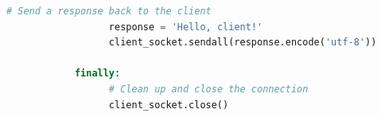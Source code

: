 \begin{multicols}{2}
\begin{lstlisting}[language=Python, caption=TCP Server Example Using Sockets in Python]
                  # Send a response back to the client
                  response = 'Hello, client!'
                  client_socket.sendall(response.encode('utf-8'))

            finally:
                  # Clean up and close the connection
                  client_socket.close()
\end{lstlisting}


\end{multicols}
